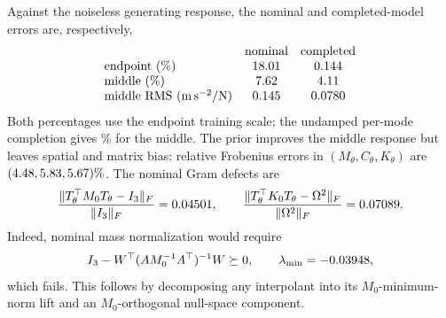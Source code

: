 Against the noiseless generating response, the nominal and completed-model
errors are, respectively,
\[
 \begin{array}{lcc}
 &\text{nominal}&\text{completed}\\
 \text{endpoint (\%)}&18.01&0.144\\
 \text{middle (\%)}&7.62&4.11\\
 \text{middle RMS }(\mathrm{m\,s^{-2}/N})&0.145&0.0780
 \end{array}
\]
Both percentages use the endpoint training scale; the undamped per-mode
completion gives \SpringOldMiddle\% for the middle. The prior improves the
middle response but leaves spatial and matrix bias: relative Frobenius
errors in $(M_\theta,C_\theta,K_\theta)$ are
$(4.48,5.83,5.67)\%$.
The nominal Gram defects are
\[
 \frac{\|T_\theta^{\top}M_0T_\theta-I_3\|_F}{\|I_3\|_F}=0.04501,
 \qquad
 \frac{\|T_\theta^{\top}K_0T_\theta-\Omega^2\|_F}{\|\Omega^2\|_F}
 =0.07089.
\]
Indeed, nominal mass normalization would require
\[
 I_3-W^{\top}(AM_0^{-1}A^{\top})^{-1}W\succeq0,
 \qquad\lambda_{\min}=-0.03948,
\]
which fails. This follows by decomposing any interpolant into its
$M_0$-minimum-norm lift and an $M_0$-orthogonal null-space component.
